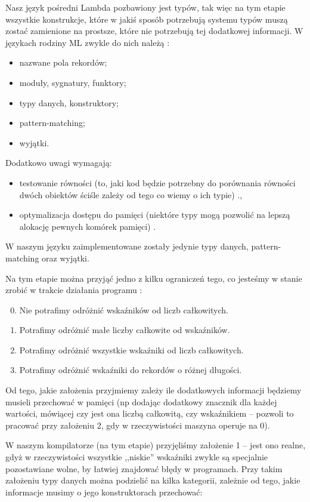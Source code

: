 \documentclass[11pt]{scrartcl}
\begin{document}
Nasz język pośredni Lambda pozbawiony jest typów, tak więc na tym etapie
wszystkie konstrukcje, które w jakiś sposób potrzebują systemu typów muszą
zostać zamienione na prostsze, które nie potrzebują tej dodatkowej informacji.
W językach rodziny ML zwykle do nich należą \cite[Chapter 4: ML-specific optimizations]{Appel}:
\begin{itemize}
\item nazwane pola rekordów;
\item moduły, sygnatury, funktory;
\item typy danych, konstruktory;
\item pattern-matching;
\item wyjątki.
\end{itemize}
Dodatkowo uwagi wymagają:
\begin{itemize}
\item testowanie równości (to, jaki kod będzie potrzebny do porównania
  równości dwóch obiektów ściśle zależy od tego co wiemy o ich typie)
  \cite[Chapter 4.3: Equality]{Appel}.,
\item optymalizacja dostępu do pamięci (niektóre typy mogą pozwolić na lepszą alokację
  pewnych komórek pamięci) \cite[Chapter 4.4: Unboxed updates]{Appel}.
\end{itemize}
W naszym języku zaimplementowane zostały jedynie typy danych, pattern-matching
oraz wyjątki.

Na tym etapie można przyjąć jedno z kilku ograniczeń tego, co jesteśmy w stanie
zrobić w trakcie działania programu \cite[Chapter 4.1: Data representation]{Appel}:
\begin{enumerate}
\setcounter{enumi}{-1}
\item Nie potrafimy odróżnić wskaźników od liczb całkowitych.
\item Potrafimy odróżnić małe liczby całkowite od wskaźników.
\item Potrafimy odróżnić wszystkie wskaźniki od liczb całkowitych.
\item Potrafimy odróżnić wskaźniki do rekordów o różnej długości.
\end{enumerate}
Od tego, jakie założenia przyjmiemy zależy ile dodatkowych informacji będziemy
musieli przechować w pamięci (np dodając dodatkowy znacznik dla każdej wartości,
mówiącej czy jest ona liczbą całkowitą, czy wskaźnikiem -- pozwoli to pracować
przy założeniu 2, gdy w rzeczywistości maszyna operuje na 0).

W naszym kompilatorze (na tym etapie) przyjęliśmy założenie 1 -- jest ono realne,
gdyż w rzeczywistości wszystkie ,,niskie'' wskaźniki zwykle są specjalnie
pozostawiane wolne, by łatwiej znajdować błędy w programach.
Przy takim założeniu typy danych można podzielić na kilka kategorii, zależnie od
tego, jakie informacje musimy o jego konstruktorach przechować:
\end{document}
